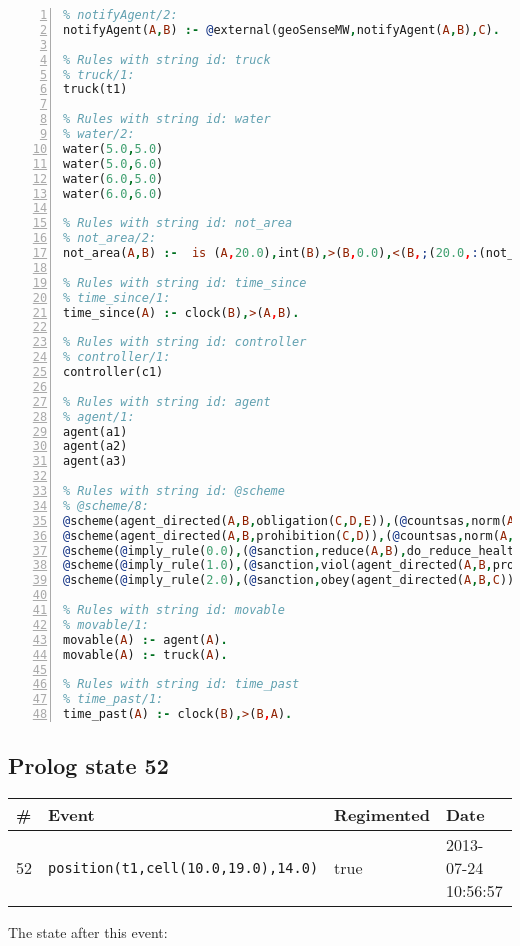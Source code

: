 \documentclass[11pt]{article}\usepackage[utf8]{inputenc}\usepackage{geometry}
\begin{document}
\begin{lstlisting}[language=Prolog, numbers=left]
% Rules with string id: notifyAgent
% notifyAgent/2:
notifyAgent(A,B) :- @external(geoSenseMW,notifyAgent(A,B),C).

% Rules with string id: truck
% truck/1:
truck(t1)

% Rules with string id: water
% water/2:
water(5.0,5.0)
water(5.0,6.0)
water(6.0,5.0)
water(6.0,6.0)

% Rules with string id: not_area
% not_area/2:
not_area(A,B) :-  is (A,20.0),int(B),>(B,0.0),<(B,;(20.0,:(not_area(A,B), is (-(B),20.0)))),int(A),>(A,0.0),<(A,;(20.0,:(area(A,B),-(int(A))))),int(B),>(A,0.0),>(B,0.0),<(A,21.0),<(B,21.0).

% Rules with string id: time_since
% time_since/1:
time_since(A) :- clock(B),>(A,B).

% Rules with string id: controller
% controller/1:
controller(c1)

% Rules with string id: agent
% agent/1:
agent(a1)
agent(a2)
agent(a3)

% Rules with string id: @scheme
% @scheme/8:
@scheme(agent_directed(A,B,obligation(C,D,E)),(@countsas,norm(A,B,F,obligation(C,D,E)),F),false,(listTrue(C)),(time_past(D)),false,[plus(viol(agent_directed(A,B,obligation(C,D,E))))|[]],[plus(obey(agent_directed(A,B,obligation(C,D,E))))|[]])
@scheme(agent_directed(A,B,prohibition(C,D)),(@countsas,norm(A,B,E,prohibition(C,D)),E),(listTrue(C)),false,(false),false,[plus(viol(agent_directed(A,B,prohibition(C,D))))|[]],[plus(obey(agent_directed(A,B,prohibition(C,D))))|[]])
@scheme(@imply_rule(0.0),(@sanction,reduce(A,B),do_reduce_health(A,B),notifyAgent(A,changed(status))),true,false,false,false,[min(reduce(A,B))|[]],[])
@scheme(@imply_rule(1.0),(@sanction,viol(agent_directed(A,B,prohibition(C,D))),do_sanction(D)),true,false,false,false,[min(viol(agent_directed(A,B,prohibition(C,D))))|[]],[])
@scheme(@imply_rule(2.0),(@sanction,obey(agent_directed(A,B,C))),true,false,false,false,[min(obey(agent_directed(A,B,C)))|[]],[])

% Rules with string id: movable
% movable/1:
movable(A) :- agent(A).
movable(A) :- truck(A).

% Rules with string id: time_past
% time_past/1:
time_past(A) :- clock(B),>(B,A).

\end{lstlisting}
\clearpage 
\subsection{Prolog state 52}
\begin{table}[ht]
\centering 
\begin{tabular}{l l l l} 
\textbf{\#} & \textbf{Event} & \textbf{Regimented} & \textbf{Date} \\ [0.5ex] 
\hline
52&\texttt{position(t1,cell(10.0,19.0),14.0)}&true&2013-07-24 10:56:57\\ [1ex] \hline\end{tabular}
\end{table}
The state after this event:
\end{document}
